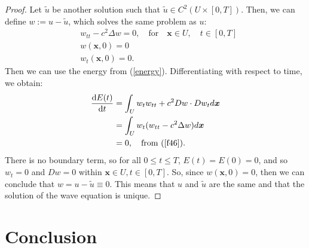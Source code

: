 \documentclass[a4paper, 12pt]{article}
\numberwithin{equation}{section}
\begin{document}
\begin{proof}
    Let $\tilde{u}$ be another solution such that $\tilde{u} \in C^2(U \times
    [0,T])$. Then, we can define $w:=u-\tilde{u}$, which solves the same problem
    as $u$:
    \begin{equation} \label{f46}
        \begin{aligned}
            &w_{tt}-c^2\Delta w =0, \quad \textrm{for} \quad \boldsymbol{x} \in U, \quad t \in [0,T]\\
            &w(\boldsymbol{x}, 0)=0\\
            &w_t(\boldsymbol{x}, 0)=0.
        \end{aligned}
    \end{equation}
    Then we can use the energy from (\ref{energy}). Differentiating with respect
    to time, we obtain:
    \begin{equation*}
        \begin{aligned}
            \diff{E(t)}{t}&=\int_U w_t w_{tt} + c^2 Dw \cdot Dw_t d\boldsymbol{x}\\
            &=\int_U w_t (w_{tt}-c^2 \Delta w)d\boldsymbol{x}\\
            &=0, \quad \textrm{from (\ref{f46})}.
        \end{aligned}
    \end{equation*}
    There is no boundary term, so for all $0 \le t \le T$, $E(t)=E(0)=0$, and so
    $w_t=0$ and $Dw=0$ within $\boldsymbol{x} \in U, t \in [0,T]$. So, since
    $w(\boldsymbol{x}, 0)=0$, then we can conclude that $w=u-\tilde{u}\equiv 0$.
    This means that $u$ and $\tilde{u}$ are the same and that the solution of
    the wave equation is unique.
\renewcommand\qedsymbol{q.e.d.}
\end{proof}

\section{Conclusion}

\newpage 



\end{document}
